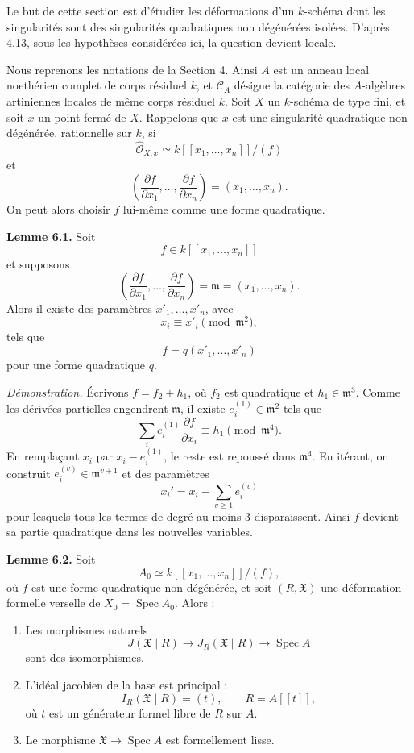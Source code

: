 \documentclass[11pt]{article}
\providecommand{\Spec}{\operatorname{Spec}}
\providecommand{\Oo}{\mathcal O}
\begin{document}
Le but de cette section est d'étudier les déformations d'un \(k\)-schéma dont les singularités sont des singularités quadratiques non dégénérées isolées.  D'après 4.13, sous les hypothèses considérées ici, la question devient locale.

Nous reprenons les notations de la Section 4.  Ainsi \(A\) est un anneau local noethérien complet de corps résiduel \(k\), et \(\mathcal C_A\) désigne la catégorie des \(A\)-algèbres artiniennes locales de même corps résiduel \(k\).  Soit \(X\) un \(k\)-schéma de type fini, et soit \(x\) un point fermé de \(X\).  Rappelons que \(x\) est une singularité quadratique non dégénérée, rationnelle sur \(k\), si
\[
        \widehat{\Oo}_{X,x}
        \simeq
        k[[x_1,\ldots,x_n]]/(f)
\]
et
\[
        \left(\frac{\partial f}{\partial x_1},\ldots,
        \frac{\partial f}{\partial x_n}\right)=(x_1,\ldots,x_n).
\]
On peut alors choisir \(f\) lui-même comme une forme quadratique.

\textbf{Lemme 6.1.}  Soit
\[
        f\in k[[x_1,\ldots,x_n]]
\]
et supposons
\[
        \left(\frac{\partial f}{\partial x_1},\ldots,
        \frac{\partial f}{\partial x_n}\right)=\mathfrak m=(x_1,\ldots,x_n).
\]
Alors il existe des paramètres \(x'_1,\ldots,x'_n\), avec
\[
        x_i\equiv x'_i\pmod{\mathfrak m^2},
\]
tels que
\[
        f=q(x'_1,\ldots,x'_n)
\]
pour une forme quadratique \(q\).

\emph{Démonstration.}  Écrivons \(f=f_2+h_1\), où \(f_2\) est quadratique et \(h_1\in\mathfrak m^3\).  Comme les dérivées partielles engendrent \(\mathfrak m\), il existe \(e_i^{(1)}\in\mathfrak m^2\) tels que
\[
        \sum_i e_i^{(1)}\frac{\partial f}{\partial x_i}
        \equiv h_1\pmod{\mathfrak m^4}.
\]
En remplaçant \(x_i\) par \(x_i-e_i^{(1)}\), le reste est repoussé dans \(\mathfrak m^4\).  En itérant, on construit \(e_i^{(v)}\in\mathfrak m^{v+1}\) et des paramètres
\[
        x_i' = x_i-\sum_{v\geq 1}e_i^{(v)}
\]
pour lesquels tous les termes de degré au moins \(3\) disparaissent.  Ainsi \(f\) devient sa partie quadratique dans les nouvelles variables.

\textbf{Lemme 6.2.}  Soit
\[
        A_0\simeq k[[x_1,\ldots,x_n]]/(f),
\]
où \(f\) est une forme quadratique non dégénérée, et soit \((R,\mathfrak X)\) une déformation formelle verselle de \(X_0=\Spec A_0\).  Alors :
\begin{enumerate}[label=(\arabic*)]
\item Les morphismes naturels
\[
        J(\mathfrak X\mid R)\longrightarrow J_R(\mathfrak X\mid R)
        \longrightarrow \Spec A
\]
sont des isomorphismes.
\item L'idéal jacobien de la base est principal :
\[
        I_R(\mathfrak X\mid R)=(t),
        \qquad
        R=A[[t]],
\]
où \(t\) est un générateur formel libre de \(R\) sur \(A\).
\item Le morphisme \(\mathfrak X\to\Spec A\) est formellement lisse.
\end{enumerate}
\end{document}
